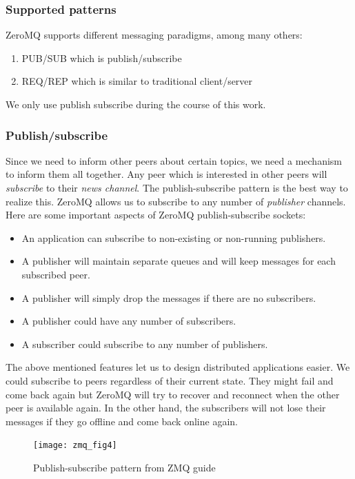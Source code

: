 \subsubsection{Supported patterns}
ZeroMQ supports different messaging paradigms, among many others:
\begin{enumerate}
\item PUB/SUB which is publish/subscribe
\item REQ/REP which is similar to traditional client/server
\end{enumerate}
We only use publish subscribe during the course of this work.

\subsubsection{Publish/subscribe}
Since we need to inform other peers about certain topics, we need a mechanism to inform them all together.
Any peer which is interested in other peers will \textit{subscribe} to their \textit{news channel}. 
The publish-subscribe pattern is the best way to realize this. 
ZeroMQ allows us to subscribe to any number of \textit{publisher} channels. 
Here are some important aspects of ZeroMQ publish-subscribe sockets:
\begin{itemize}
\item An application can subscribe to non-existing or non-running publishers.
\item A publisher will maintain separate queues and will keep messages for each subscribed peer.
\item A publisher will simply drop the messages if there are no subscribers.
\item A publisher could have any number of subscribers.
\item A subscriber could subscribe to any number of publishers.
\end{itemize}

The above mentioned features let us to design distributed applications easier.
We could subscribe to peers regardless of their current state. 
They might fail and come back again but ZeroMQ will try to recover and reconnect when the other peer is available again.
In the other hand, the subscribers will not lose their messages if they go offline and come back online again.

\begin{figure}[h]
  \centering
  \texttt{[image: zmq\_fig4]}
  \caption[Publish-subscribe pattern.]
   {Publish-subscribe pattern from ZMQ guide \cite{zguide}}
\end{figure}

